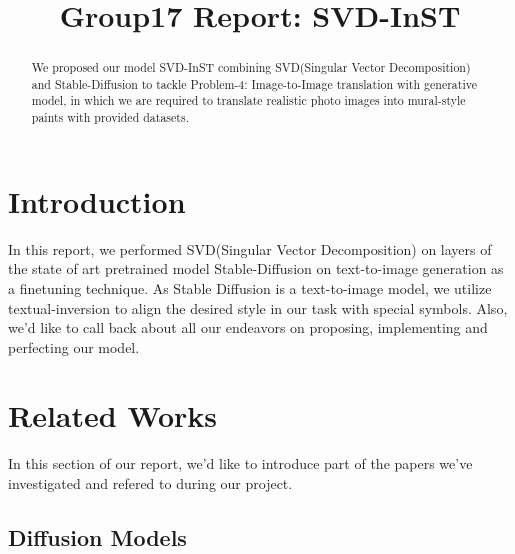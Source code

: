 \documentclass[conference]{IEEEtran}
\begin{document}
\title{Group17 Report: SVD-InST}

\author{
\and
{}
\and
{}
}

\maketitle

\begin{abstract}
We proposed our model SVD-InST combining SVD(Singular Vector Decomposition) and Stable-Diffusion to tackle Problem-4: Image-to-Image translation with generative model, in which we are required to translate realistic photo images into mural-style paints with provided datasets.
\end{abstract}


\section{Introduction}
In this report, we performed SVD(Singular Vector Decomposition) on layers of the state of art pretrained model Stable-Diffusion on text-to-image generation as a finetuning technique. As Stable Diffusion is a text-to-image model, we utilize textual-inversion to align the desired style in our task with special symbols. Also, we'd like to call back about all our endeavors on proposing, implementing and perfecting our model.

\section{Related Works}
In this section of our report, we'd like to introduce part of the papers we've investigated and refered to during our project.

\subsection{Diffusion Models}
\end{document}
